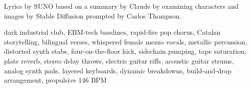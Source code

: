 
\label{sec:tres-ciutats-una-mateixa-frequencia}
\begin{notes}
Lyrics by SUNO based on a summary by Claude by examining characters and images by Stable Diffusion prompted by Carlos Thompson.
\end{notes}
\begin{style}
dark industrial club, EBM-tech basslines, rapid-fire pop chorus, Catalan storytelling, bilingual verses, whispered female mezzo vocals, metallic percussion, distorted synth stabs, four-on-the-floor kick, sidechain pumping, tape saturation, plate reverb, stereo delay throws, electric guitar riffs, acoustic guitar strums, analog synth pads, layered keyboards, dynamic breakdowns, build-and-drop arrangement, propulsive 146 BPM
\end{style}
